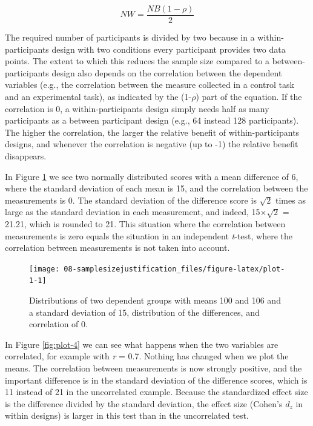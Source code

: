 \documentclass[
  oneside]{krantz}
\begin{document}
\[NW = \frac{NB (1-\rho)}{2}\]

The required number of participants is divided by two because in a within-participants design with two conditions every participant provides two data points. The extent to which this reduces the sample size compared to a between-participants design also depends on the correlation between the dependent variables (e.g., the correlation between the measure collected in a control task and an experimental task), as indicated by the (1-\(\rho\)) part of the equation. If the correlation is 0, a within-participants design simply needs half as many participants as a between participant design (e.g., 64 instead 128 participants). The higher the correlation, the larger the relative benefit of within-participants designs, and whenever the correlation is negative (up to -1) the relative benefit disappears.

In Figure \ref{fig:plot-1} we see two normally distributed scores with a mean difference of 6, where the standard deviation of each mean is 15, and the correlation between the measurements is 0. The standard deviation of the difference score is \(\sqrt{2}\) times as large as the standard deviation in each measurement, and indeed, 15×\(\sqrt{2}\) = 21.21, which is rounded to 21. This situation where the correlation between measurements is zero equals the situation in an independent \emph{t}-test, where the correlation between measurements is not taken into account.



\begin{figure}

{\centering \texttt{[image: 08-samplesizejustification\_files/figure-latex/plot-1-1]} 

}

\caption{Distributions of two dependent groups with means 100 and 106 and a standard deviation of 15, distribution of the differences, and correlation of 0.}\label{fig:plot-1}
\end{figure}

In Figure \ref{fig:plot-4} we can see what happens when the two variables are correlated, for example with \emph{r} = 0.7. Nothing has changed when we plot the means. The correlation between measurements is now strongly positive, and the important difference is in the standard deviation of the difference scores, which is 11 instead of 21 in the uncorrelated example. Because the standardized effect size is the difference divided by the standard deviation, the effect size (Cohen's \(d_z\) in within designs) is larger in this test than in the uncorrelated test.
\end{document}
